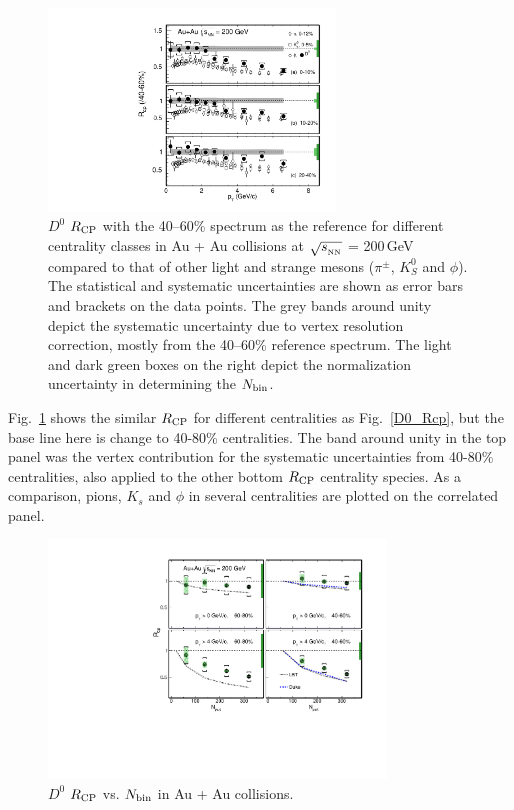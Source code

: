 \begin{figure}
\centering
\includegraphics[width=0.68\textwidth]{figure/Run14_D0HFT/D0_Rcp2.pdf}
\caption{$D^{0}$ $R_{\rm CP}$ with the 40--60\% spectrum as the reference for different centrality classes in Au + Au collisions at $\sqrt{s_{_{\rm NN}}}$ = 200\,GeV compared to that of other light and strange mesons ($\pi^{\pm}$, $K^0_{S}$ and $\phi$). The statistical and systematic uncertainties are shown as error bars and brackets on the data points. The grey bands around unity depict the systematic uncertainty due to vertex resolution correction, mostly from the 40--60\% reference spectrum. The light and dark green boxes on the right depict the normalization uncertainty in determining the $N_{\rm bin}$.}
\label{D0_Rcp2} 
\end{figure}

Fig.~\ref{D0_Rcp2} shows the similar $R_{\rm CP}$ for different centralities as Fig.~\ref{D0_Rcp}, but the base line here is change to 40-80\% centralities. The band around unity in the top panel was the vertex contribution for the systematic uncertainties from 40-80\% centralities, also applied to the other bottom $R_{\rm CP}$ centrality species. As a comparison, pions, $K_{s}$ and $\phi$ in several centralities are plotted on the correlated panel.

\begin{figure}
\centering
\includegraphics[width=0.8\textwidth]{figure/Run14_D0HFT/Rcp_Nbin_D0.pdf}
\caption{$D^{0}$ $R_{\rm CP}$ vs. $N_{\rm bin}$ in Au + Au collisions.}
\label{Rcp_Nbin_D0} 
\end{figure}


